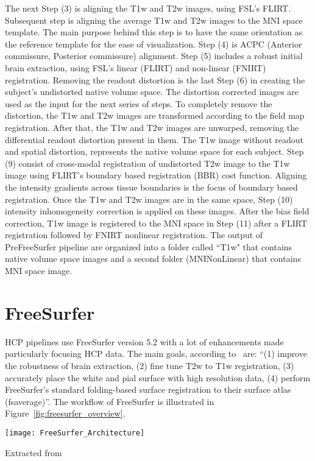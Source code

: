 The next Step (3) is aligning the T1w and T2w images, using FSL's FLIRT. Subsequent step is aligning the average T1w and T2w images to the MNI space template. The main purpose behind this step is to have the same orientation as the reference template for the ease of visualization. Step (4) is ACPC (Anterior commissure, Posterior commissure) alignment. Step (5) includes a robust initial brain extraction, using FSL's linear (FLIRT) and non-linear (FNIRT) registration. Removing the readout distortion is the last Step (6) in creating the subject's undistorted native volume space. The distortion corrected images are used as the input for the next series of steps. To completely remove the distortion, the T1w and T2w images are transformed according to the field map registration. After that, the T1w and T2w images are unwarped, removing the differential readout distortion present in them. The T1w image without readout and spatial distortion, represents the native volume space for each subject. Step (9) consist of cross-modal registration of undistorted T2w image to the T1w image using FLIRT's boundary based registration (BBR) cost function. Aligning the intensity gradients across tissue boundaries is the focus of boundary based registration. Once the T1w and T2w images are in the same space, Step (10) intensity inhomogeneity correction is applied on these images. After the bias field correction, T1w image is registered to the MNI space in Step (11) after a FLIRT registration followed by FNIRT nonlinear registration. 
The output of PreFreeSurfer pipeline are organized into a folder called ``T1w" that contains native volume space images and a second folder (MNINonLinear) that contains MNI space image.~\cite{Gla13}

\section{FreeSurfer} \label{sec:FreeSurfer}
HCP pipelines use FreeSurfer version 5.2 with a lot of enhancements made particularly focusing HCP data. The main goals, according to~\cite{Gla13} are: ``(1) improve the robustness of brain extraction, (2) fine tune T2w to T1w registration, (3) accurately place the white and pial surface with high resolution data, (4) perform FreeSurfer's standard folding-based surface registration to their surface atlas (fsaverage)''. The workflow of FreeSurfer is illustrated in Figure~\ref{fig:freesurfer_overview}.

\begin{center}
  \texttt{[image: FreeSurfer\_Architecture]}
  \label{fig:freesurfer_overview}
  \caption*{Extracted from \cite{Gla13}}
\end{center}

